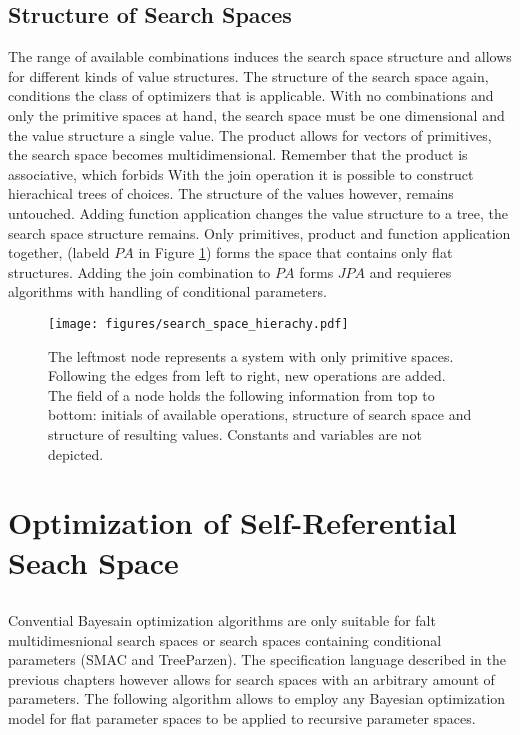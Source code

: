 \documentclass[english]{article}
\begin{document}
\subsection{Structure of Search Spaces}
The range of available combinations induces the search space structure and allows for different kinds of value structures. The structure of the search space again, conditions the class of optimizers that is applicable.
With no combinations and only the primitive spaces at hand, the search space must be one dimensional and the value structure a single value.
The product allows for vectors of primitives, the search space becomes multidimensional. Remember that the product is associative, which forbids
With the join operation it is possible to construct hierachical trees of choices. The structure of the values however, remains untouched.
Adding function application changes the value structure to a tree, the search space structure remains.
Only primitives, product and function application together, (labeld $PA$ in Figure \ref{space_structure}) forms the space that contains only flat structures. Adding the join combination to $PA$ forms $JPA$ and requieres algorithms with handling of conditional parameters.


\begin{figure}
\texttt{[image: figures/search\_space\_hierachy.pdf]}

  \caption{The leftmost node represents a system with only primitive spaces. Following the edges from left to right, new operations are added. The field of a node holds the following information from top to bottom: initials of available operations, structure of search space and structure of resulting values. Constants and variables are not depicted.}
  \label{space_structure}
\end{figure}


\section{Optimization of Self-Referential Seach Space}

\subsection{}
Convential Bayesain optimization algorithms are only suitable for falt multidimesnional search spaces or search spaces containing conditional parameters (SMAC and TreeParzen). The specification language described in the previous chapters however allows for search spaces with an arbitrary amount of parameters. The following algorithm allows to employ any Bayesian optimization model for flat parameter spaces to be applied to recursive parameter spaces.
\end{document}
